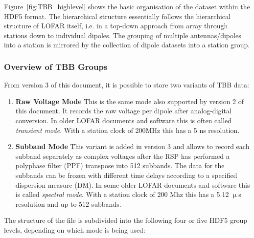 \documentclass[a4paper,10pt,bibtotoc]{scrartcl}
\begin{document}
Figure~\ref{fig:TBB_highlevel} shows the basic organisation of the dataset within
the HDF5 format. The hierarchical structure essentially follows the
hierarchical structure of LOFAR itself, i.e. in a top-down approach
from array through stations down to individual dipoles. The grouping
of multiple antennas/dipoles into a station is mirrored by the
collection of dipole datasets into a station group.

\subsubsection{Overview of TBB Groups}

From version 3 of this document, it is possible to store two variants of TBB data:
\begin{enumerate}
\item \textbf{Raw Voltage Mode} This is the same mode also supported by version 2 of this document. It records the raw voltage per dipole after analog-digital conversion. In older LOFAR documents and software this is often called \emph{transient mode}. With a station clock of 200MHz this has a 5 ns resolution.%
\item \textbf{Subband Mode} This variant is added in version 3 and allows to record each subband separately as complex voltages after the RSP has performed a polyphase filter (PPF) transpose into 512 subbands. The data for the subbands can be frozen with different time delays according to a specified dispersion measure (DM). In some older LOFAR documents and software this is called \emph{spectral mode}. With a station clock of 200 Mhz this has a 5.12 $\upmu$s resolution and up to 512 subbands.%
\end{enumerate}

The structure of the file is subdivided into the following four or five HDF5 group levels, depending on which mode is being used:
\end{document}
